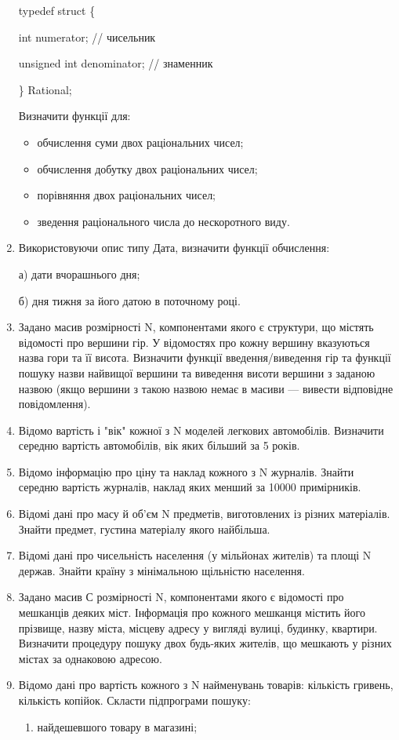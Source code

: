 \documentclass[]{article}
\makeatletter
\newcommand{\xslalph}[1]{\expandafter\@xslalph\csname c@#1\endcsname}
\newcommand{\@xslalph}[1]{%
    \ifcase#1\or а\or б\or в\or г\or д\or e\or є\or ж\or з\or i%
    \or й\or к\or л\or м\or н\or о\or п\or р\or с\or т%
    \or у\or ф\or х\or ц\or ч\or ш\or ю\or я\or аа\or бб\or вв %
    \else\@ctrerr\fi%
}
\makeatother
\begin{document}
\begin{enumerate}
typedef struct \{

int numerator; // чисельник

unsigned int denominator; // знаменник

\} Rational;

Визначити функції для:
\begin{itemize}

\item обчислення суми двох раціональних чисел;
\item обчислення добутку двох раціональних чисел;
\item порівняння двох раціональних чисел;
\item зведення раціонального числа до нескоротного виду.
\end{itemize}

\item
Використовуючи опис типу Дата, визначити функції обчислення:

а) дати вчорашнього дня;

б) дня тижня за його датою в поточному році.
\item
Задано масив розмірності N, компонентами якого є структури, що містять
відомості про вершини гір. У відомостях про кожну вершину вказуються
назва гори та її висота. Визначити функції введення/виведення гір та
функції пошуку назви найвищої вершини та виведення висоти вершини з
заданою назвою (якщо вершини з такою назвою немає в масиви --- вивести
відповідне повідомлення).
\item
Відомо вартість і "вік" кожної з N моделей легкових автомобілів.
Визначити середню вартість автомобілів, вік яких більший за 5 років.
\item
Відомо інформацію про ціну та наклад кожного з N журналів. Знайти
середню вартість журналів, наклад яких менший за 10000 примірників.
\item
Відомі дані про масу й об'єм N предметів, виготовлених із різних
матеріалів. Знайти предмет, густина матеріалу якого найбільша.
\item
Відомі дані про чисельність населення (у мільйонах жителів) та площі N
держав. Знайти країну з мінімальною щільністю населення.
\item
Задано масив С розмірності N, компонентами якого є відомості про
мешканців деяких міст. Інформація про кожного мешканця містить його
прізвище, назву міста, місцеву адресу у вигляді вулиці, будинку,
квартири. Визначити процедуру пошуку двох будь-яких жителів, що мешкають
у різних містах за однаковою адресою.
\item
Відомо дані про вартість кожного з N найменувань товарів: кількість
гривень, кількість копійок. Скласти підпрограми пошуку:
\begin{enumerate}[label=\xslalph*)]
\item найдешевшого товару в магазині;


\end{enumerate}
\end{enumerate}
\end{document}
